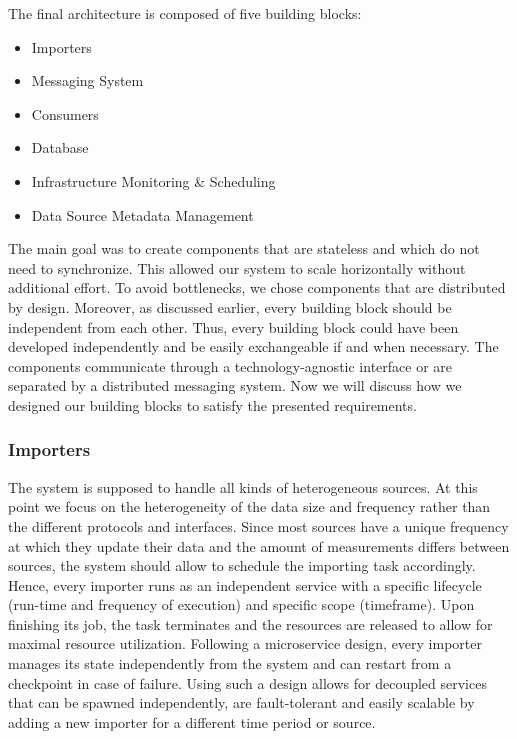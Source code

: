 The final architecture is composed of five building blocks:

\begin{itemize}
\tightlist
\item
  Importers
\item
  Messaging System
\item
  Consumers
\item
  Database
\item
  Infrastructure Monitoring \& Scheduling
\item
  Data Source Metadata Management
\end{itemize}

The main goal was to create components that are stateless and which do not
need to synchronize. This allowed our system to scale horizontally
without additional effort. To avoid bottlenecks, we chose components that
are distributed by design. Moreover, as discussed earlier, every building
block should be independent from each other. Thus, every building block
could have been developed independently and be easily exchangeable if and when
necessary. The components communicate through a technology-agnostic
interface or are separated by a distributed messaging system. Now we
will discuss how we designed our building blocks to satisfy the
presented requirements.

\subsubsection{Importers}\label{importers}

The system is supposed to handle all kinds of heterogeneous sources. At
this point we focus on the heterogeneity of the data size and frequency
rather than the different protocols and interfaces. Since most sources
have a unique frequency at which they update their data and the amount
of measurements differs between sources, the system should allow to
schedule the importing task accordingly. Hence, every importer runs as
an independent service with a specific lifecycle (run-time and frequency
of execution) and specific scope (timeframe). Upon finishing its job, the
task terminates and the resources are released to allow for maximal
resource utilization. Following a microservice design, every importer
manages its state independently from the system and can restart from a
checkpoint in case of failure. Using such a design allows for decoupled
services that can be spawned independently, are fault-tolerant and
easily scalable by adding a new importer for a different time period or
source.

